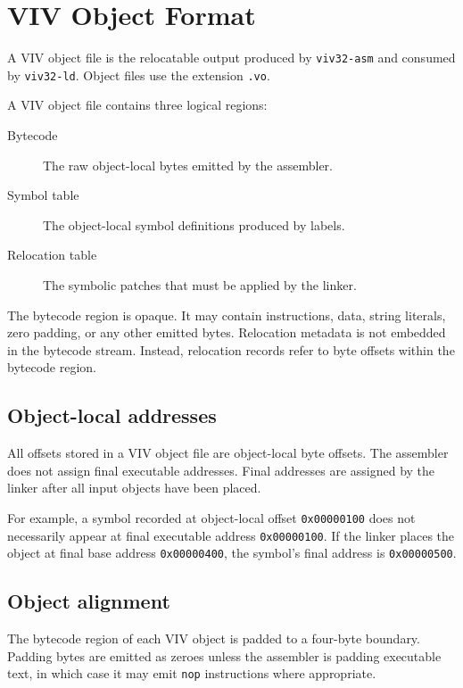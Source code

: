 \section{VIV Object Format}
\label{sec:toolchain-object-format}

A VIV object file is the relocatable output produced by \texttt{viv32-asm} and
consumed by \texttt{viv32-ld}. Object files use the extension \texttt{.vo}.

A VIV object file contains three logical regions:

\begin{description}
    \item[Bytecode] The raw object-local bytes emitted by the assembler.
    \item[Symbol table] The object-local symbol definitions produced by labels.
    \item[Relocation table] The symbolic patches that must be applied by the linker.
\end{description}

The bytecode region is opaque. It may contain instructions, data, string literals,
zero padding, or any other emitted bytes. Relocation metadata is not embedded in the
bytecode stream. Instead, relocation records refer to byte offsets within the bytecode
region.

\subsection{Object-local addresses}

All offsets stored in a VIV object file are object-local byte offsets. The assembler
does not assign final executable addresses. Final addresses are assigned by the linker
after all input objects have been placed.

For example, a symbol recorded at object-local offset \texttt{0x00000100} does not
necessarily appear at final executable address \texttt{0x00000100}. If the linker
places the object at final base address \texttt{0x00000400}, the symbol's final
address is \texttt{0x00000500}.

\subsection{Object alignment}

The bytecode region of each VIV object is padded to a four-byte boundary. Padding bytes
are emitted as zeroes unless the assembler is padding executable text, in which case it
may emit \texttt{nop} instructions where appropriate.

